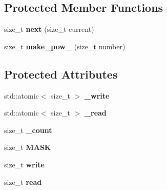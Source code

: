 \subsection*{Protected Member Functions}
\begin{DoxyCompactItemize}
\item 
\hypertarget{class_d_s_g_1_1_ring_buffer_a6d7a76a4c9b38ccde46344662e08c9e5}{size\+\_\+t {\bfseries next} (size\+\_\+t current)}\label{class_d_s_g_1_1_ring_buffer_a6d7a76a4c9b38ccde46344662e08c9e5}

\item 
\hypertarget{class_d_s_g_1_1_ring_buffer_aaf481e139011e91b111cc048e726cafb}{size\+\_\+t {\bfseries make\+\_\+pow\+\_} (size\+\_\+t number)}\label{class_d_s_g_1_1_ring_buffer_aaf481e139011e91b111cc048e726cafb}

\end{DoxyCompactItemize}
\subsection*{Protected Attributes}
\begin{DoxyCompactItemize}
\item 
\hypertarget{class_d_s_g_1_1_ring_buffer_a78bd7704fd059b745bc82421e1062123}{std\+::atomic$<$ size\+\_\+t $>$ {\bfseries \+\_\+write}}\label{class_d_s_g_1_1_ring_buffer_a78bd7704fd059b745bc82421e1062123}

\item 
\hypertarget{class_d_s_g_1_1_ring_buffer_aa71bb75a5d24700be795a30e1a135a54}{std\+::atomic$<$ size\+\_\+t $>$ {\bfseries \+\_\+read}}\label{class_d_s_g_1_1_ring_buffer_aa71bb75a5d24700be795a30e1a135a54}

\item 
\hypertarget{class_d_s_g_1_1_ring_buffer_af6d0e1658a1f1aa298218b890e458f2f}{size\+\_\+t {\bfseries \+\_\+count}}\label{class_d_s_g_1_1_ring_buffer_af6d0e1658a1f1aa298218b890e458f2f}

\item 
\hypertarget{class_d_s_g_1_1_ring_buffer_a2fba2ff6ee3886101f0f58b0fd7f3641}{size\+\_\+t {\bfseries M\+A\+S\+K}}\label{class_d_s_g_1_1_ring_buffer_a2fba2ff6ee3886101f0f58b0fd7f3641}

\item 
\hypertarget{class_d_s_g_1_1_ring_buffer_a703434b6afb87f1f9a05750278a822e3}{size\+\_\+t {\bfseries write}}\label{class_d_s_g_1_1_ring_buffer_a703434b6afb87f1f9a05750278a822e3}

\item 
\hypertarget{class_d_s_g_1_1_ring_buffer_a34bc659c286c8913e318c0e8c0777204}{size\+\_\+t {\bfseries read}}\label{class_d_s_g_1_1_ring_buffer_a34bc659c286c8913e318c0e8c0777204}

\end{DoxyCompactItemize}


